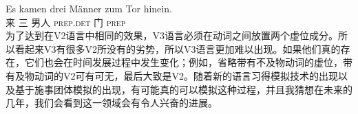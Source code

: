 \ea
\gll Es kamen drei Männer zum Tor hinein.\\
     \expl{} 来 三 男人 \textsc{prep}.\textsc{det} 门 \textsc{prep}\\
\z
为了达到在V2语言中相同的效果，V3语言必须在动词之间放置两个虚位成分。所以看起来V3有很多V2所没有的劣势，所以V3语言更加难以出现。如果他们真的存在，它们也会在时间发展过程中发生变化；例如，省略带有不及物动词的虚位，带有及物动词的V2可有可无，最后大致是V2。随着新的语言习得模拟技术的出现以及基于施事团体模拟的出现，有可能真的可以模拟这种过程，并且我猜想在未来的几年，我们会看到这一领域会有令人兴奋的进展。

